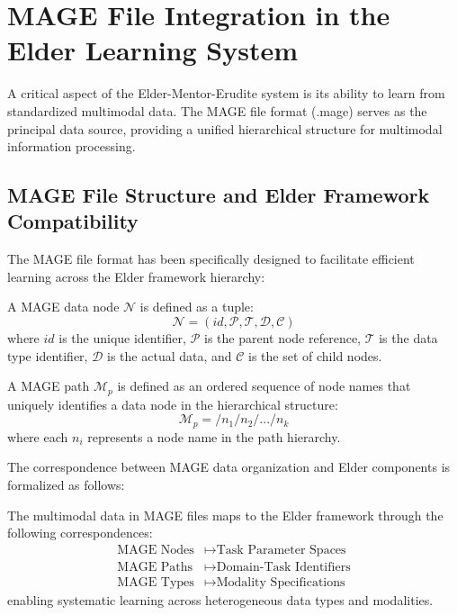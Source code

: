 \section{MAGE File Integration in the Elder Learning System}

A critical aspect of the Elder-Mentor-Erudite system is its ability to learn from standardized multimodal data. The MAGE file format (.mage) serves as the principal data source, providing a unified hierarchical structure for multimodal information processing.

\subsection{MAGE File Structure and Elder Framework Compatibility}

The MAGE file format has been specifically designed to facilitate efficient learning across the Elder framework hierarchy:

\begin{definition}
A MAGE data node $\mathcal{N}$ is defined as a tuple:
\begin{equation}
\mathcal{N} = (id, \mathcal{P}, \mathcal{T}, \mathcal{D}, \mathcal{C})
\end{equation}
where $id$ is the unique identifier, $\mathcal{P}$ is the parent node reference, $\mathcal{T}$ is the data type identifier, $\mathcal{D}$ is the actual data, and $\mathcal{C}$ is the set of child nodes.
\end{definition}

\begin{definition}
A MAGE path $\mathcal{M}_p$ is defined as an ordered sequence of node names that uniquely identifies a data node in the hierarchical structure:
\begin{equation}
\mathcal{M}_p = /n_1/n_2/.../n_k
\end{equation}
where each $n_i$ represents a node name in the path hierarchy.
\end{definition}

The correspondence between MAGE data organization and Elder components is formalized as follows:

\begin{proposition}
The multimodal data in MAGE files maps to the Elder framework through the following correspondences:
\begin{align}
\text{MAGE Nodes} &\mapsto \text{Task Parameter Spaces} \\
\text{MAGE Paths} &\mapsto \text{Domain-Task Identifiers} \\
\text{MAGE Types} &\mapsto \text{Modality Specifications}
\end{align}
enabling systematic learning across heterogeneous data types and modalities.
\end{proposition}

